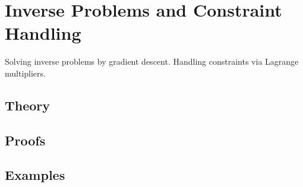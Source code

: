
\section{Inverse Problems and Constraint Handling}
\label{sec:2.4.18-inverse-problems}

\begin{ticket}
Solving inverse problems by gradient descent. Handling constraints via Lagrange multipliers.
\end{ticket}

\subsection*{Theory}

\subsection*{Proofs}

\subsection*{Examples}
